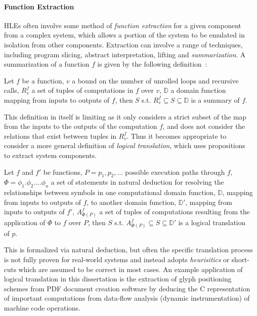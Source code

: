 \paragraph{Function Extraction}
HLEs often involve some method of \emph{function extraction} for a given component from a complex system, which allows a portion of the system to be emulated in isolation from other components.
Extraction can involve a range of techniques, including program slicing, abstract interpretation, lifting and \emph{summarization}.
A summarization of a function $f$ is given by the following definition~\cite{interpolation}:

\begin{definition}
\label{def:summarization}
Let $f$ be a function, $v$ a bound on the number of unrolled loops and recursive calls, $R_{v}^{f}$ a set of tuples of computations in $f$ over $v$, $\mathbb{D}$ a domain function mapping from inputs to outputs of $f$, then $S$ s.t. $R_{v}^{f} \subseteq S \subseteq \mathbb{D}$ is a summary of $f$.
\end{definition}

This definition in itself is limiting as it only considers a strict subset of the map from the inputs to the outputs of the computation $f$, and does not consider the relations that exist between tuples in $R_{v}^{f}$.
Thus it becomes appropriate to consider a more general definition of \emph{logical translation}, which uses propositions to extract system components.

\begin{definition}
\label{def:nested-summarization}
	Let $f$ and $f'$ be functions, $P = p_{1}, p_{2}, \dots $ possible
	execution paths through $f$, $\Phi = \phi_{1} . \phi_{2} . \dots
	\phi_{n}$ a set of statements in natural deduction for resolving the
	relationships between symbols in one computational domain function,
	$\mathbb{D}$, mapping from inputs to outputs of $f$, to another domain
	function, $\mathbb{D}'$, mapping from inputs to outputs of $f'$,
	$A_{\Phi(P)}^{f}$ a set of tuples of computations resulting from the
	application of $\Phi$ to $f$ over $P$, then $S$ s.t. $A_{\Phi(P)}^{f}
	\subseteq S \subseteq \mathbb{D}'$ is a logical translation of
	$p$.
\end{definition}

This is formalized via natural deduction, but often the specific translation process is not fully proven for real-world systems and instead adopts \emph{heurisitics} or short-cuts which are assumed to be correct in most cases.
An example application of logical translation in this dissertation is the extraction of glyph positioning schemes from PDF document creation software by deducing the C representation of important computations from data-flow analysis (dynamic instrumentation) of machine code operations.

